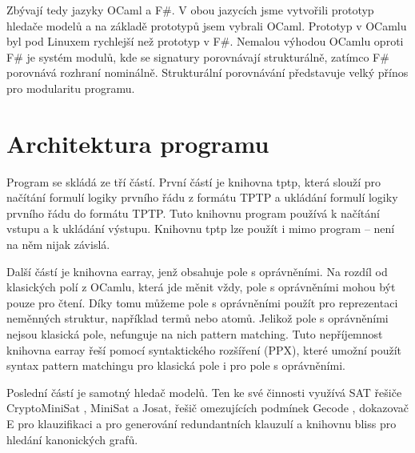 
Zbývají tedy jazyky OCaml a F\#.
V obou jazycích jsme vytvořili prototyp
hledače modelů a na základě prototypů
jsem vybrali OCaml.
Prototyp v OCamlu byl pod Linuxem rychlejší než prototyp v F\#.
Nemalou výhodou OCamlu oproti F\# je systém modulů,
kde se signatury porovnávají strukturálně,
zatímco F\# porovnává rozhraní nominálně.
Strukturální porovnávání představuje velký přínos pro modularitu
programu.

\section{Architektura programu}

Program \crossbow{} se skládá ze tří částí.
První částí je knihovna tptp, která slouží
pro načítání formulí logiky prvního řádu
z formátu TPTP \cite{tptpformat} a ukládání formulí logiky prvního řádu
do formátu TPTP. Tuto knihovnu program \crossbow{} používá
k načítání vstupu a k ukládání výstupu.
Knihovnu tptp lze použít i mimo program \crossbow{} -- není
na něm nijak závislá.

Další částí je knihovna earray, jenž obsahuje pole s oprávněními.
Na rozdíl od klasických polí z OCamlu, která jde měnit vždy,
pole s oprávněními mohou být pouze pro čtení.
Díky tomu můžeme pole s oprávněními použít pro reprezentaci
neměnných struktur, například termů nebo atomů.
Jelikož pole s oprávněními nejsou klasická pole,
nefunguje na nich pattern matching.
Tuto nepříjemnost knihovna earray řeší pomocí
syntaktického rozšíření (PPX), které umožní použít
syntax pattern matchingu pro klasická pole
i pro pole s oprávněními.

Poslední částí je samotný hledač modelů.
Ten ke své činnosti využívá SAT řešiče CryptoMiniSat \cite{cryptominisat},
MiniSat \cite{minisat} a Josat, řešič omezujících podmínek
Gecode \cite{gecode}, dokazovač E \cite{eprover18} pro klauzifikaci a
pro generování redundantních klauzulí a knihovnu bliss \cite{bliss}
pro hledání kanonických grafů.

